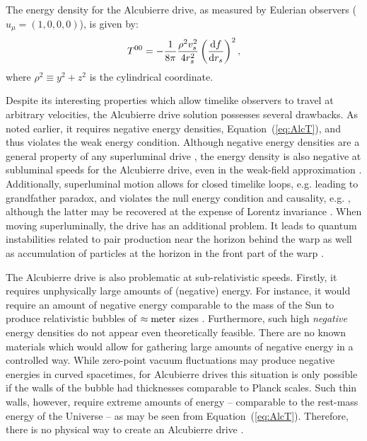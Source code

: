 \documentclass[10pt]{iopart}
\begin{document}
The energy density for the Alcubierre drive, as measured by Eulerian observers ($u_\mu = (1,0,0,0)$), is given by:
\begin{equation}
\label{eq:AlcT}
    T^{00}=-\frac{1}{8\pi}\frac{\rho^2 v_s^2}{4r_s^2}\left(\frac{{\rm d} f}{{\rm d} r_s}\right)^2,
\end{equation}
where $\rho^2 \equiv y^2 + z^2$ is the cylindrical coordinate.


Despite its interesting properties which allow timelike observers to travel at arbitrary velocities, the Alcubierre drive solution possesses several drawbacks. As noted earlier, it requires negative energy densities, Equation~(\ref{eq:AlcT}), and thus violates the weak energy condition. Although negative energy densities are a general property of any superluminal drive \cite{Olum1998,Visser2000},  the energy density is also negative at subluminal speeds for the Alcubierre drive, even in the weak-field approximation \cite{Lobo2004}. Additionally, superluminal motion allows for closed timelike loops, e.g. leading to grandfather paradox, and violates the null energy condition and causality, e.g. \cite{Everett1996}, although the latter may be recovered at the expense of Lorentz invariance \cite{Liberati2002}. When moving superluminally, the drive has an additional problem. It leads to quantum instabilities related to pair production near the horizon behind the warp as well as accumulation of particles at the horizon in the front part of the warp \cite{Finazzi2009}.

The Alcubierre drive is also problematic at sub-relativistic speeds. Firstly, it requires unphysically large amounts of (negative) energy. For instance, it would require an amount of negative energy comparable to the mass of the Sun to produce relativistic bubbles of $\approx \rm{meter}$ sizes \cite{Alcubierre1994}. Furthermore, such high {\it negative} energy densities do not appear even theoretically feasible. There are no known materials which would allow for gathering large amounts of negative energy in a controlled way. While zero-point vacuum fluctuations may produce negative energies in curved spacetimes, for Alcubierre drives this situation is only possible if the walls of the bubble had thicknesses comparable to Planck scales. Such thin walls, however, require extreme amounts of energy -- comparable to the rest-mass energy of the Universe -- as may be seen from Equation~(\ref{eq:AlcT}). Therefore, there is no physical way to create an Alcubierre drive \cite{Pfenning1997CQG,Ford1997}.
\end{document}

